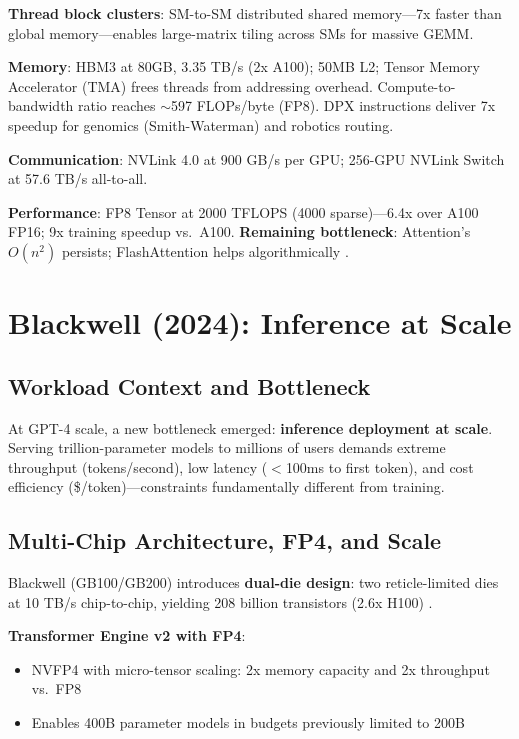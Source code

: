 \documentclass{article}
\begin{document}
\textbf{Thread block clusters}: SM-to-SM distributed shared memory---7x faster than global memory---enables large-matrix tiling across SMs for massive GEMM.

\textbf{Memory}: HBM3 at 80GB, 3.35 TB/s (2x A100); 50MB L2; Tensor Memory Accelerator (TMA) frees threads from addressing overhead. Compute-to-bandwidth ratio reaches $\sim$597 FLOPs/byte (FP8). DPX instructions deliver 7x speedup for genomics (Smith-Waterman) and robotics routing.

\textbf{Communication}: NVLink 4.0 at 900 GB/s per GPU; 256-GPU NVLink Switch at 57.6 TB/s all-to-all.

\textbf{Performance}: FP8 Tensor at 2000 TFLOPS (4000 sparse)---6.4x over A100 FP16; 9x training speedup vs.\ A100. \textbf{Remaining bottleneck}: Attention's $O(n^2)$ persists; FlashAttention helps algorithmically \cite{dao2022flashattention}.

\section{Blackwell (2024): Inference at Scale}

\subsection{Workload Context and Bottleneck}

At GPT-4 scale, a new bottleneck emerged: \textbf{inference deployment at scale}. Serving trillion-parameter models to millions of users demands extreme throughput (tokens/second), low latency ($<$100ms to first token), and cost efficiency (\$/token)---constraints fundamentally different from training.

\subsection{Multi-Chip Architecture, FP4, and Scale}

Blackwell (GB100/GB200) introduces \textbf{dual-die design}: two reticle-limited dies at 10 TB/s chip-to-chip, yielding 208 billion transistors (2.6x H100) \cite{nvidia2024blackwell}.

\textbf{Transformer Engine v2 with FP4}:
\begin{itemize}
\item NVFP4 with micro-tensor scaling: 2x memory capacity and 2x throughput vs.\ FP8
\item Enables 400B parameter models in budgets previously limited to 200B
\end{itemize}
\end{document}
